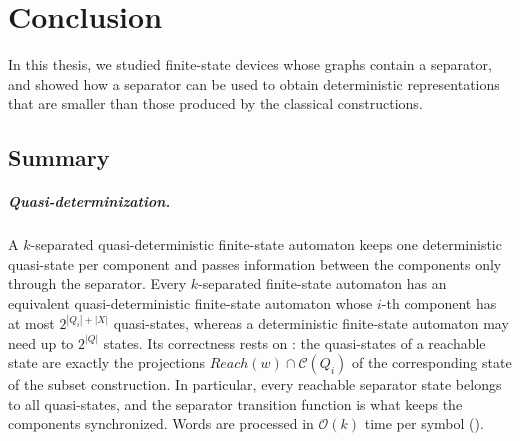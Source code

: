 \chapter{Conclusion}
\label{chapter:conclusion}

In this thesis, we studied finite-state devices whose graphs contain a separator, and
showed how a separator can be used to obtain deterministic representations that are
smaller than those produced by the classical constructions.

\section{Summary}

\paragraph{Quasi-determinization.}
A $k$-separated quasi-deterministic finite-state automaton keeps one deterministic
quasi-state per component and passes information between the components only through
the separator. Every $k$-separated finite-state automaton has an equivalent
quasi-deterministic finite-state automaton whose $i$-th component has at most $2^{|Q_i|
+ |X|}$ quasi-states, whereas a deterministic finite-state automaton may need up to
$2^{|Q|}$ states. Its correctness rests on : the
quasi-states of a reachable state are exactly the projections $Reach(w) \cap
\mathcal{C}(Q_i)$ of the corresponding state of the subset construction. In particular,
every reachable separator state belongs to all quasi-states, and the separator transition
function is what keeps the components synchronized. Words are processed in
$\mathcal{O}(k)$ time per symbol ().

